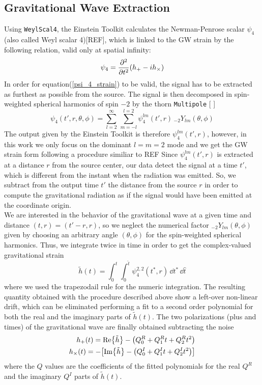 \subsection{Gravitational Wave Extraction}
\label{gw_extraction}
Using \texttt{WeylScal4}, the Einstein Toolkit calculates the  Newman-Penrose scalar $\psi_4$ (also called Weyl scalar 4)[REF], which is linked to the GW strain by the following relation, valid only at spatial infinity:
\begin{equation}
\label{psi_4_strain}
\psi_{4} = \pdv[2]{}{t} \qty(h_{+} - i h_{\times})
\end{equation}
In order for equation(\ref{psi_4_strain}) to be valid, the signal has to be extracted as furthest as possible from the source.
The signal is then decomposed in spin-weighted spherical harmonics of spin $ - 2$ by the thorn \texttt{Multipole} [%
] 
\[
\psi_4 (t',r,\theta,\phi)= \sum_{l=2} ^{\infty} \, \sum _{m=-l} ^{l=2} \psi^{lm} _4 (t',r) \, _{-2} Y _{lm} (\theta, \phi) 
\]
The output given by the Einstein Toolkit is therefore $\psi_{4} ^{lm} (t',r)$, however, in this work we only focus on the dominant $l = m = 2$ mode and we get the GW strain form following a procedure similiar to REF%
Since $\psi^{lm} _4 (t',r)$ is extracted at a distance $r$ from the source center,  our data detect the signal at a time $t'$, which is different from the instant when the radiation was emitted.
So, we subtract from the output time $t'$ the distance from the source $r$
in order to compute the gravitational radiation as if the signal would have been emitted at the coordinate origin.\\
We are interested in the behavior of the gravitational wave at a given time and distance $(t,r) = (t'-r,r)$, so we neglect the numerical factor $_{-2} Y _{lm} (\theta, \phi)$ given by choosing an arbitrary angle $(\theta,\phi)$ for the spin-weighted spherical harmonics.
Thus, we integrate twice in time in order to get the complex-valued gravitational strain
\[
\tilde{h}(t) = \int _0 ^{t} \int _0 ^{\hat{t}} \psi_4 ^{2,2} (t^{*},r)
\, \dd t^{*} \,  \dd \hat{t}
\]
where we used the trapezodail rule for the numeric integration.
The resulting quantity obtained with the procedure described above show a left-over non-linear drift, which can be eliminated  performing a fit to a second order polynomial for both the real and the imaginary parts of $\tilde{h}(t)$.
The two polarizations (plus and times) of the gravitational wave are finally obtained subtracting the noise
\begin{eqnarray}
\label{h_+_numerical}
h_{+} (t)= \Re {\tilde{h}} -  \qty(Q_0 ^{R} + Q_1 ^{R} t + Q_2 ^{R} t^{2}) \\
\label{h_x_numerical}
h_{\times}(t) = - \qty[
\Im {\tilde{h}} -
\qty(Q_0 ^{I} + Q_1 ^{I} t + Q_2 ^{I} t^{2})
]
\end{eqnarray}
where the $Q$ values are the coefficients of the fitted polynomials for the real $Q^{R}$ and the imaginary $Q^{I}$ parts of $\tilde{h}(t)$.\\


